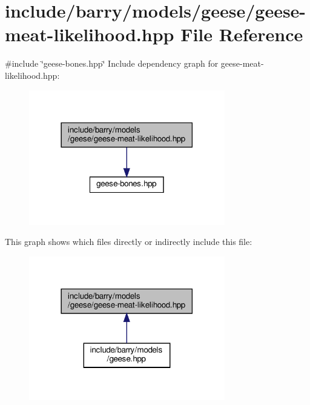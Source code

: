 \hypertarget{geese-meat-likelihood_8hpp}{}\section{include/barry/models/geese/geese-\/meat-\/likelihood.hpp File Reference}
\label{geese-meat-likelihood_8hpp}
{\ttfamily \#include \char`\"{}geese-\/bones.\+hpp\char`\"{}}\newline
Include dependency graph for geese-\/meat-\/likelihood.hpp\+:
\nopagebreak
\begin{figure}[H]
\begin{center}
\leavevmode
\includegraphics[width=242pt]{geese-meat-likelihood_8hpp__incl}
\end{center}
\end{figure}
This graph shows which files directly or indirectly include this file\+:
\nopagebreak
\begin{figure}[H]
\begin{center}
\leavevmode
\includegraphics[width=242pt]{geese-meat-likelihood_8hpp__dep__incl}
\end{center}
\end{figure}
